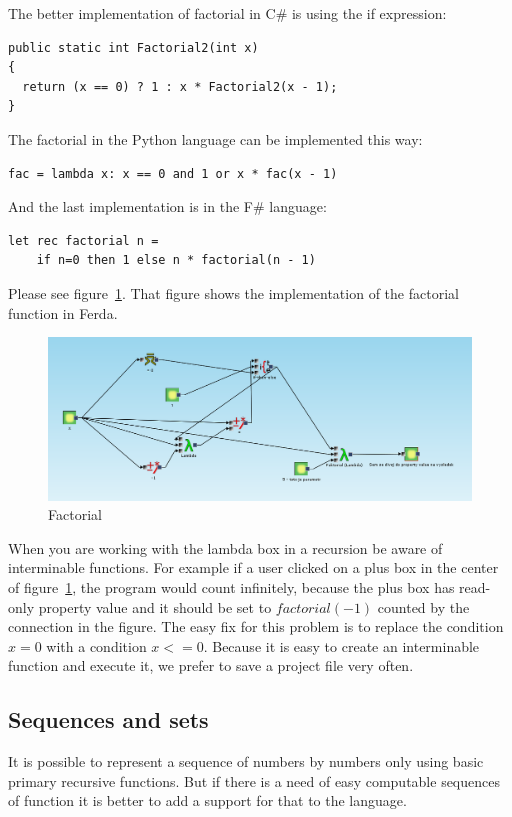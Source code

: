 \documentclass[a4paper,12pt]{book}
\begin{document}
The better implementation of factorial in C\# is using the if expression:
\begin{verbatim}
public static int Factorial2(int x)
{
  return (x == 0) ? 1 : x * Factorial2(x - 1);
}
\end{verbatim}

The factorial in the Python language can be implemented this way:
\begin{verbatim}
fac = lambda x: x == 0 and 1 or x * fac(x - 1)
\end{verbatim}

And the last implementation is in the F\# language:
\begin{verbatim}
let rec factorial n =
    if n=0 then 1 else n * factorial(n - 1)
\end{verbatim}

Please see figure~\ref{fig:factorial}. That figure shows the implementation of the factorial function in Ferda.
\begin{figure}
	\includegraphics[width=1\textwidth]{faktorial}
	\caption{Factorial}
	\label{fig:factorial}
\end{figure}

When you are working with the lambda box in a recursion be aware of interminable functions. For example if a user clicked on a plus box in the center of figure~\ref{fig:factorial}, the program would count infinitely, because the plus box has read-only property value and it should be set to $factorial(-1)$ counted by the connection in the figure. The easy fix for this problem is to replace the condition $x=0$ with a condition $x<=0$. Because it is easy to create an interminable function and execute it, we prefer to save a project file very often.

\subsection{Sequences and sets}
\label{sec:sequences}
It is possible to represent a sequence of numbers by numbers only using basic primary recursive functions. But if there is a need of easy computable sequences of function it is better to add a support for that to the language.
\end{document}
